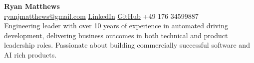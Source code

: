 \documentclass[10pt,a4paper]{article}
\begin{document}
\vspace*{-1cm} %

\noindent
\begin{minipage}[t]{0.65\textwidth}
    \textbf{\fontsize{24pt}{28pt}\selectfont Ryan Matthews}\\[0.2cm]
    \href{mailto:ryanjmatthews@gmail.com}{ryanjmatthews@gmail.com} \quad
    \href{https://linkedin.com/in/ryan-j-matthews}{LinkedIn} \quad
    \href{https://github.com/Darainer}{GitHub} \quad +49 176 34599887\\[0.6cm]
    \small
    Engineering leader with over 10 years of experience in automated driving development, delivering business outcomes in both technical and product leadership roles. Passionate about building commercially successful software and AI rich products.
\end{minipage}
\hspace{1.5cm}
\begin{minipage}[t]{0.25\textwidth}
\end{minipage}
\end{document}
